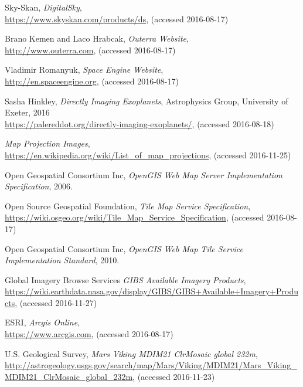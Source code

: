 \begin{thebibliography}{99}
  Sky-Skan,
  \emph{DigitalSky},
  \\
  \url{https://www.skyskan.com/products/ds},
  (accessed 2016-08-17)
    
  Brano Kemen and Laco Hrabcak,
  \emph{Outerra Website},
  \\
  \url{http://www.outerra.com},
  (accessed 2016-08-17)
    
  Vladimir Romanyuk,
  \emph{Space Engine Website},
  \\
  \url{http://en.spaceengine.org},
  (accessed 2016-08-17)
  
  Sasha Hinkley,
  \emph{Directly Imaging Exoplanets},
  Astrophysics Group, University of Exeter,
  2016 \\
  \url{https://palereddot.org/directly-imaging-exoplanets/},
  (accessed 2016-08-18)
 
  \emph{Map Projection Images},
  \\
  \url{https://en.wikipedia.org/wiki/List_of_map_projections},
  (accessed 2016-11-25)

  Open Geospatial Consortium Inc,
  \emph{OpenGIS Web Map Server Implementation Specification},
  2006.

  Open Source Geospatial Foundation,
  \emph{Tile Map Service Specification},
  \\
  \url{https://wiki.osgeo.org/wiki/Tile_Map_Service_Specification},
  (accessed 2016-08-17)
  
  Open Geospatial Consortium Inc,
  \emph{OpenGIS Web Map Tile Service Implementation Standard},
  2010.

  Global Imagery Browse Services
  \emph{GIBS Available Imagery Products},
  \\
  \url{https://wiki.earthdata.nasa.gov/display/GIBS/GIBS+Available+Imagery+Products},
  (accessed 2016-11-27)

  ESRI,
  \emph{Arcgis Online},
  \\
  \url{https://www.arcgis.com},
  (accessed 2016-08-17)

  U.S. Geological Survey,
  \emph{Mars Viking MDIM21 ClrMosaic global 232m},
  \\
  \url{http://astrogeology.usgs.gov/search/map/Mars/Viking/MDIM21/Mars_Viking_MDIM21_ClrMosaic_global_232m},
  (accessed 2016-11-23)
  

\end{thebibliography}
